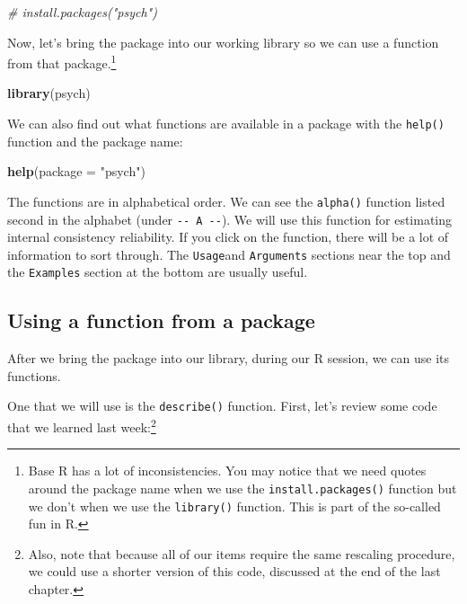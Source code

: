 \documentclass[
]{article}
\newenvironment{Shaded}{\begin{snugshade}}{\end{snugshade}}
\newcommand{\CommentTok}[1]{\textcolor[rgb]{0.56,0.35,0.01}{\textit{#1}}}
\newcommand{\DataTypeTok}[1]{\textcolor[rgb]{0.13,0.29,0.53}{#1}}
\newcommand{\KeywordTok}[1]{\textcolor[rgb]{0.13,0.29,0.53}{\textbf{#1}}}
\newcommand{\NormalTok}[1]{#1}
\newcommand{\StringTok}[1]{\textcolor[rgb]{0.31,0.60,0.02}{#1}}
\begin{document}
\begin{Shaded}
\begin{Highlighting}[]
\CommentTok{# install.packages("psych")}
\end{Highlighting}
\end{Shaded}

Now, let's bring the package into our working library so we can use a function from that package.\footnote{Base R has a lot of inconsistencies. You may notice that we need quotes around the package name when we use the \texttt{install.packages()} function but we don't when we use the \texttt{library()} function. This is part of the so-called fun in R.}

\begin{Shaded}
\begin{Highlighting}[]
\KeywordTok{library}\NormalTok{(psych)}
\end{Highlighting}
\end{Shaded}

We can also find out what functions are available in a package with the \texttt{help()} function and the package name:

\begin{Shaded}
\begin{Highlighting}[]
\KeywordTok{help}\NormalTok{(}\DataTypeTok{package =} \StringTok{"psych"}\NormalTok{)}
\end{Highlighting}
\end{Shaded}

The functions are in alphabetical order. We can see the \texttt{alpha()} function listed second in the alphabet (under \texttt{-\/-\ A\ -\/-}). We will use this function for estimating internal consistency reliability. If you click on the function, there will be a lot of information to sort through. The \texttt{Usage}and \texttt{Arguments} sections near the top and the \texttt{Examples} section at the bottom are usually useful.

\hypertarget{using-a-function-from-a-package}{%
\subsection{Using a function from a package}\label{using-a-function-from-a-package}}

After we bring the package into our library, during our R session, we can use its functions.

One that we will use is the \texttt{describe()} function. First, let's review some code that we learned last week:\footnote{Also, note that because all of our items require the same rescaling procedure, we could use a shorter version of this code, discussed at the end of the last chapter.}
\end{document}
